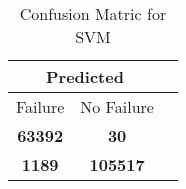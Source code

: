 \begin{table}[] 
\caption{Confusion Matric for SVM} 
\label{Table: Prediction Accuracy-DMDSVMSVMEKF-ignoresolarPanelDipole-solarPanelDipole} 
\centering 
\begin{tabular} 
 {@{}ccc@{}} 
\toprule 
\multicolumn{2}{c}{\textbf{Predicted}}
 \\ \midrule 
\multicolumn{1}{|c|}{Failure} & 
\multicolumn{1}{c|}{No Failure}
 \\ \midrule 
\multicolumn{1}{|c|}{\color{green}\textbf{63392}} & 
\multicolumn{1}{c|}{\color{red}\textbf{30}}
 \\ \midrule 
\multicolumn{1}{|c|}{\color{red}\textbf{1189}} & 
\multicolumn{1}{c|}{\color{green}\textbf{105517}}
 \\ \bottomrule 
\end{tabular} 
\end{table} 
